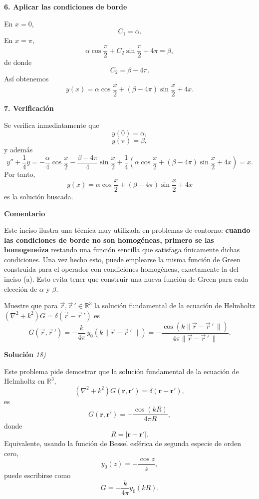\documentclass[11pt,spanish]{article}
\newcommand{\norm}[1]{\lVert{#1}\,\rVert}
\newcommand{\pvec}[1]{\vec{#1}{\,}'}
\newcounter{problema}
\newcommand{\prob}{\stepcounter{problema} \vspace{.5cm} \noindent{\bf Problema \arabic{problema}: }}
\begin{document}
{\bf 6. Aplicar las condiciones de borde}

En $x=0$,
$$
C_1=\alpha.
$$
En $x=\pi$,
$$
\alpha\cos\frac{\pi}{2}
+
C_2\sin\frac{\pi}{2}
+
4\pi
=
\beta,
$$
de donde
$$
C_2
=
\beta-4\pi.
$$
Así obtenemos
$$
\boxed{
y(x)
=
\alpha\cos\frac{x}{2}
+
(\beta-4\pi)\sin\frac{x}{2}
+
4x.
}
$$

{\bf 7. Verificación}

Se verifica inmediatamente que
$$
y(0)=\alpha,
$$
$$
y(\pi)=\beta,
$$
y además
$$
y''+\frac14y
=
-\frac{\alpha}{4}\cos\frac{x}{2}
-\frac{\beta-4\pi}{4}\sin\frac{x}{2}
+\frac14\left(
\alpha\cos\frac{x}{2}
+
(\beta-4\pi)\sin\frac{x}{2}
+
4x
\right)
=
x.
$$
Por tanto,
$$
\boxed{
y(x)
=
\alpha\cos\frac{x}{2}
+
(\beta-4\pi)\sin\frac{x}{2}
+
4x
}
$$
es la solución buscada.

{\bf Comentario}

Este inciso ilustra una técnica muy utilizada en problemas de contorno: {\bf cuando las condiciones de borde no son homogéneas, primero se las homogeneiza} restando una función sencilla que satisfaga únicamente dichas condiciones. Una vez hecho esto, puede emplearse la misma función de Green construida para el operador con condiciones homogéneas, exactamente la del inciso (a). Esto evita tener que construir una nueva función de Green para cada elección de $\alpha$ y $\beta$.









\prob Muestre que para \(\vec{r},\pvec{r}\in\mathbb{R}^3\) la solución fundamental de la ecuación de Helmholtz \((\nabla^2+k^2)G=\delta(\vec{r}-\pvec{r})\) es
\[
G(\vec{r},\pvec{r}) = -\frac{k}{4\pi}\,y_0(k\norm{\vec{r}-\pvec{r}}) = -\frac{\cos(k\norm{\vec{r}-\pvec{r}})}{4\pi\norm{\vec{r}-\pvec{r}}}.
\]

\vspace{0.5cm}
{\bf Soluci\'on }{\em 18)}
\vspace{0.5cm}

Este problema pide demostrar que la solución fundamental de la ecuación de Helmholtz en $\mathbb{R}^3$,
$$
(\nabla^2+k^2)G(\mathbf r,\mathbf r')
=
\delta(\mathbf r-\mathbf r'),
$$
es
$$
\boxed{
G(\mathbf r,\mathbf r')
=
-\frac{\cos(kR)}{4\pi R},
}
$$
donde
$$
R=|\mathbf r-\mathbf r'|.
$$
Equivalente, usando la función de Bessel esférica de segunda especie de orden cero,
$$
y_0(z)=-\frac{\cos z}{z},
$$
puede escribirse como
$$
G
=
-\frac{k}{4\pi}y_0(kR).
$$
\end{document}
